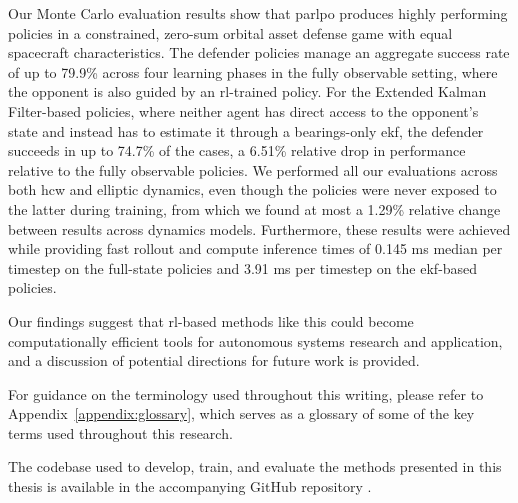 Our Monte Carlo evaluation results show that \acs{parlpo} produces highly performing policies in a constrained, zero-sum orbital asset defense game with equal spacecraft characteristics. The defender policies manage an aggregate success rate of up to 79.9\% across four learning phases in the fully observable setting, where the opponent is also guided by an \acs{rl}-trained policy. For the Extended Kalman Filter-based policies, where neither agent has direct access to the opponent's state and instead has to estimate it through a bearings-only \acs{ekf}, the defender succeeds in up to 74.7\% of the cases, a 6.51\% relative drop in performance relative to the fully observable policies. We performed all our evaluations across both \acs{hcw} and elliptic dynamics, even though the policies were never exposed to the latter during training, from which we found at most a 1.29\% relative change between results across dynamics models. Furthermore, these results were achieved while providing fast rollout and compute inference times of 0.145 ms median per timestep on the full-state policies and 3.91 ms per timestep on the \acs{ekf}-based policies.

Our findings suggest that \acs{rl}-based methods like this could become computationally efficient tools for autonomous systems research and application, and a discussion of potential directions for future work is provided.

For guidance on the terminology used throughout this writing, please refer to Appendix~\ref{appendix:glossary}, which serves as a glossary of some of the key terms used throughout this research.


The codebase used to develop, train, and evaluate the methods presented in this thesis is available in the accompanying GitHub repository \cite{researchrepo}.
